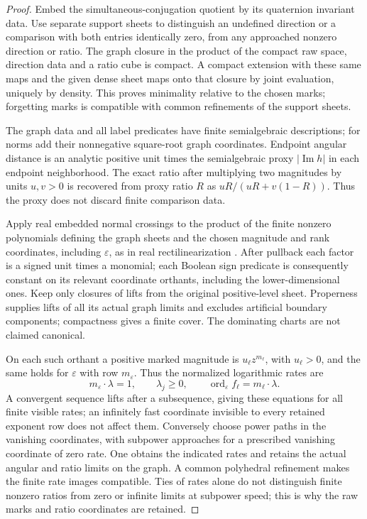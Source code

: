 \begin{proof}
Embed the simultaneous-conjugation quotient by its quaternion invariant data. Use separate support sheets to distinguish an undefined direction or a comparison with both entries identically zero, from any approached nonzero direction or ratio. The graph closure in the product of the compact raw space, direction data and a ratio cube is compact. A compact extension with these same maps and the given dense sheet maps onto that closure by joint evaluation, uniquely by density. This proves minimality relative to the chosen marks; forgetting marks is compatible with common refinements of the support sheets.

The graph data and all label predicates have finite semialgebraic descriptions; for norms add their nonnegative square-root graph coordinates. Endpoint angular distance is an analytic positive unit times the semialgebraic proxy \(|\operatorname{Im}h|\) in each endpoint neighborhood. The exact ratio after multiplying two magnitudes by units \(u,v>0\) is recovered from proxy ratio \(R\) as \(uR/(uR+v(1-R))\). Thus the proxy does not discard finite comparison data.

Apply real embedded normal crossings to the product of the finite nonzero polynomials defining the graph sheets and the chosen magnitude and rank coordinates, including \(\varepsilon\), as in real rectilinearization \cite{BierstoneMilman1988}. After pullback each factor is a signed unit times a monomial; each Boolean sign predicate is consequently constant on its relevant coordinate orthants, including the lower-dimensional ones. Keep only closures of lifts from the original positive-level sheet. Properness supplies lifts of all its actual graph limits and excludes artificial boundary components; compactness gives a finite cover. The dominating charts are not claimed canonical.

On each such orthant a positive marked magnitude is \(u_\ell z^{m_\ell}\), with \(u_\ell>0\), and the same holds for \(\varepsilon\) with row \(m_\varepsilon\). Thus the normalized logarithmic rates are
\[
 m_\varepsilon\cdot\lambda=1,\qquad
 \lambda_j\geq0,\qquad \operatorname{ord}_\varepsilon f_\ell=m_\ell\cdot\lambda.
\]
A convergent sequence lifts after a subsequence, giving these equations for all finite visible rates; an infinitely fast coordinate invisible to every retained exponent row does not affect them. Conversely choose power paths in the vanishing coordinates, with subpower approaches for a prescribed vanishing coordinate of zero rate. One obtains the indicated rates and retains the actual angular and ratio limits on the graph. A common polyhedral refinement makes the finite rate images compatible. Ties of rates alone do not distinguish finite nonzero ratios from zero or infinite limits at subpower speed; this is why the raw marks and ratio coordinates are retained.
\end{proof}

